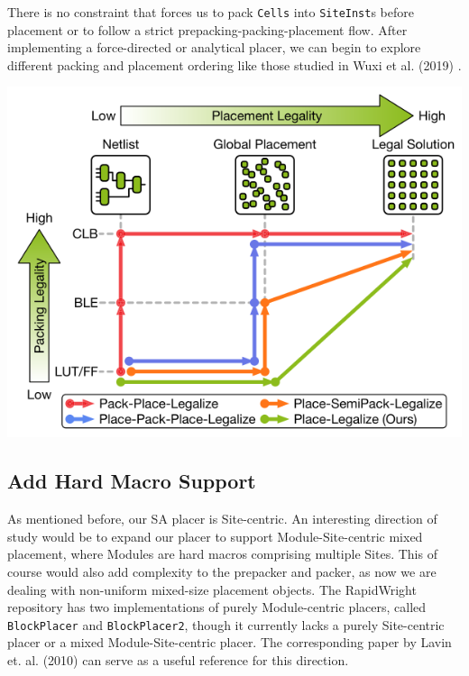 There is no constraint that forces us to pack \texttt{Cells} into \texttt{SiteInst}s before placement or to follow a strict prepacking-packing-placement flow. 
After implementing a force-directed or analytical placer, we can begin to explore different packing and placement ordering like those studied in Wuxi et al. (2019) \cite{ExplicitPacking}.

{
    \centering
    \includegraphics[width=\columnwidth]{figures/future_work/legalization.png}
}
\vspace{0.25cm}

\subsection{Add Hard Macro Support}
As mentioned before, our SA placer is Site-centric.
An interesting direction of study would be to expand our placer to support Module-Site-centric mixed placement, where Modules are hard macros comprising multiple Sites.
This of course would also add complexity to the prepacker and packer, as now we are dealing with non-uniform mixed-size placement objects.
The RapidWright repository has two implementations of purely Module-centric placers, called \texttt{BlockPlacer} and \texttt{BlockPlacer2}, though it currently lacks a purely Site-centric placer or a mixed Module-Site-centric placer.
The corresponding paper by Lavin et. al. (2010) \cite{HardBlock} can serve as a useful reference for this direction.



